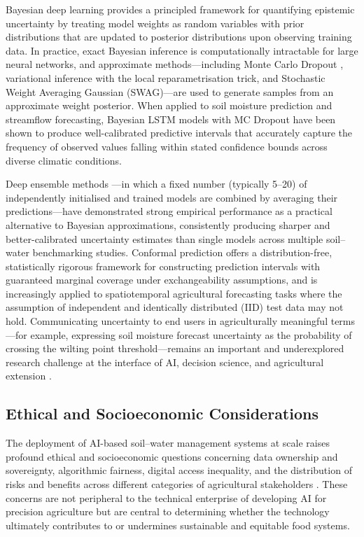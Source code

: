 \documentclass[land,article,submit,pdftex,moreauthors]{Definitions/mdpi}
\numberwithin{equation}{section}
\begin{document}
Bayesian deep learning provides a principled framework for quantifying epistemic uncertainty by treating model weights as random variables with prior distributions that are updated to posterior distributions upon observing training data. In practice, exact Bayesian inference is computationally intractable for large neural networks, and approximate methods---including Monte Carlo Dropout \citep{gal2016dropout}, variational inference with the local reparametrisation trick, and Stochastic Weight Averaging Gaussian (SWAG)---are used to generate samples from an approximate weight posterior. When applied to soil moisture prediction and streamflow forecasting, Bayesian LSTM models with MC Dropout have been shown to produce well-calibrated predictive intervals that accurately capture the frequency of observed values falling within stated confidence bounds across diverse climatic conditions.

Deep ensemble methods \citep{lakshminarayanan2017simple}---in which a fixed number (typically 5--20) of independently initialised and trained models are combined by averaging their predictions---have demonstrated strong empirical performance as a practical alternative to Bayesian approximations, consistently producing sharper and better-calibrated uncertainty estimates than single models across multiple soil--water benchmarking studies. Conformal prediction \citep{angelopoulos2023conformal} offers a distribution-free, statistically rigorous framework for constructing prediction intervals with guaranteed marginal coverage under exchangeability assumptions, and is increasingly applied to spatiotemporal agricultural forecasting tasks where the assumption of independent and identically distributed (IID) test data may not hold. Communicating uncertainty to end users in agriculturally meaningful terms---for example, expressing soil moisture forecast uncertainty as the probability of crossing the wilting point threshold---remains an important and underexplored research challenge at the interface of AI, decision science, and agricultural extension \citep{moges2021review}.

\subsection{Ethical and Socioeconomic Considerations}

The deployment of AI-based soil--water management systems at scale raises profound ethical and socioeconomic questions concerning data ownership and sovereignty, algorithmic fairness, digital access inequality, and the distribution of risks and benefits across different categories of agricultural stakeholders \citep{janssen2020responsible, shepherd2022ethics}. These concerns are not peripheral to the technical enterprise of developing AI for precision agriculture but are central to determining whether the technology ultimately contributes to or undermines sustainable and equitable food systems.
\end{document}

